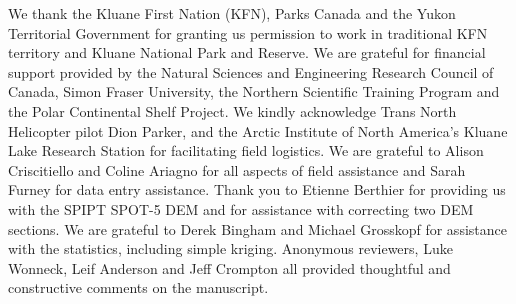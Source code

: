 \documentclass[twocolumn, letterpaper]{igs}
\begin{document}
We thank the Kluane First Nation (KFN), Parks Canada and the Yukon Territorial Government for granting us permission to work in traditional KFN territory and Kluane National Park and Reserve. We are grateful for financial support provided by the Natural Sciences and Engineering Research Council of  Canada, Simon Fraser University, the Northern Scientific  Training  Program and the Polar Continental Shelf Project. We kindly acknowledge Trans North Helicopter pilot Dion Parker, and the Arctic Institute of North America's Kluane Lake Research Station for facilitating field logistics. We are grateful to Alison Criscitiello and Coline Ariagno for all aspects of field assistance and Sarah Furney for data entry assistance. Thank you to Etienne Berthier for providing us with the SPIPT SPOT-5 DEM and for assistance with correcting two DEM sections. We are grateful to Derek Bingham and Michael Grosskopf for assistance with the statistics, including simple kriging. Anonymous reviewers, Luke Wonneck, Leif Anderson and Jeff Crompton all provided
thoughtful and constructive comments on the
manuscript.


%

%
%


\end{document}
